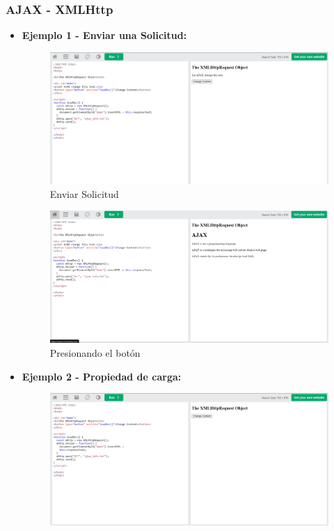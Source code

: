 \documentclass{article}
\begin{document}
    \subsubsection{AJAX - XMLHttp}
    \begin{itemize}
    	\item \textbf{Ejemplo 1 - Enviar una Solicitud:}
    	\begin{figure}[H]
    		\centering
    		\includegraphics[width=1\textwidth,keepaspectratio]{img/ejemplo1.png}
    		\caption{Enviar Solicitud}
    	\end{figure}
    	\begin{figure}[H]
    		\centering
    		\includegraphics[width=1\textwidth,keepaspectratio]{img/boton1.png}
    		\caption{Presionando el botón}
    	\end{figure}
    	\item \textbf{Ejemplo 2 - Propiedad de carga:}
    	\begin{figure}[H]
    		\centering
    		\includegraphics[width=1\textwidth,keepaspectratio]{img/ejemplo2.png}

\end{figure}
\end{itemize}
\end{document}
